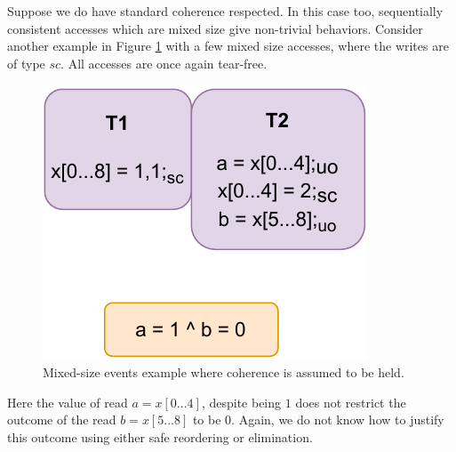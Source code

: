        Suppose we do have standard coherence respected. 
        In this case too, sequentially consistent accesses which are mixed size give non-trivial behaviors.
        Consider another example in Figure \ref{crit:coherence_mixed} with a few mixed size accesses, where the writes are of type $sc$.
        All accesses are once again tear-free.
        \begin{figure}[H]
            \centering
            \includegraphics[scale=0.7]{6.ConclusionFutureWork/CoherenceMixed.pdf}
            \caption{Mixed-size events example where coherence is assumed to be held.}
            \label{crit:coherence_mixed}
        \end{figure}

        Here the value of read $a=x[0...4]$, despite being $1$ does not restrict the outcome of the read $b=x[5...8]$ to be $0$. 
        Again, we do not know how to justify this outcome using either safe reordering or elimination. 
